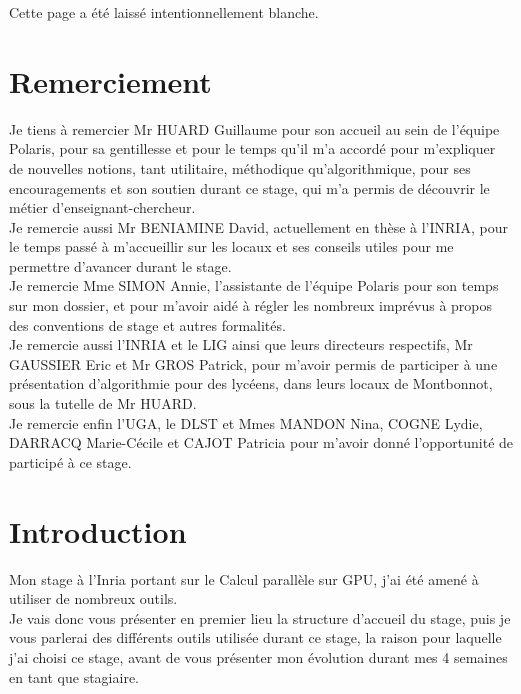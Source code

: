 \documentclass[a4paper,12pt]{article}
\begin{document}
	\newpage
	{\scriptsize Cette page a \'e{}t\'e{} laiss\'e{} intentionnellement blanche.
	\newpage
	\renewcommand{\contentsname}{
		\begin{center}
			Sommaire
		\end{center}
	}
	\setcounter{tocdepth}{3}
	\tableofcontents
	\newpage
	\section{Remerciement}
		\indent Je tiens à remercier Mr HUARD Guillaume pour son accueil au sein de l'équipe Polaris, pour sa gentillesse et pour le temps qu'il m'a accord\'e{} pour m'expliquer de nouvelles notions, tant utilitaire, m\'e{}thodique qu'algorithmique, pour ses encouragements et son soutien durant ce stage, qui m'a permis de d\'e{}couvrir le m\'e{}tier d'enseignant-chercheur. \\
		\indent Je remercie aussi Mr BENIAMINE David, actuellement en th\`ese à l'INRIA, pour le temps pass\'e{} à m’accueillir sur les locaux et ses conseils utiles pour me permettre d'avancer durant le stage.\\
		\indent Je remercie Mme SIMON Annie, l'assistante de l'\'e{}quipe Polaris pour son temps sur mon dossier, et pour m'avoir aid\'e{} à r\'e{}gler les nombreux impr\'e{}vus à propos des conventions de stage et autres formalit\'e{}s.\\
		\indent Je remercie aussi l'INRIA et le LIG ainsi que leurs directeurs respectifs, Mr GAUSSIER Eric et Mr GROS Patrick, pour m'avoir permis de participer \`a une pr\'e{}sentation d'algorithmie pour des lycéens, dans leurs locaux de Montbonnot, sous la tutelle de Mr HUARD.\\
		\indent Je remercie enfin l'UGA, le DLST et Mmes MANDON Nina, COGNE Lydie, DARRACQ Marie-Cécile et CAJOT Patricia pour m'avoir donné l'opportunité de participé à ce stage.
	\newpage
	\section{Introduction}
	\indent Mon stage à l'Inria portant sur le Calcul parall\`ele sur GPU, j'ai \'e{}t\'e{} amen\'e{} à utiliser de nombreux outils.\\
	\noindent Je vais donc vous pr\'e{}senter en premier lieu la structure d'accueil du stage, puis je vous parlerai des différents outils utilisée durant ce stage, la raison pour laquelle j'ai choisi ce stage, avant de vous pr\'e{}senter mon \'e{}volution durant mes 4 semaines en tant que stagiaire.
}
\end{document}
